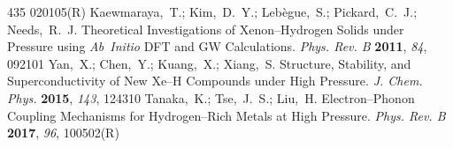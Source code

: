 \documentclass[12pt,letterpaper,oneside]{article}
\begin{document}
\begin{mcitethebibliography}{435}
  020105(R)\relax
\mciteBstWouldAddEndPuncttrue
\mciteSetBstMidEndSepPunct{\mcitedefaultmidpunct}
{\mcitedefaultendpunct}{\mcitedefaultseppunct}\relax
\EndOfBibitem
{}
Kaewmaraya,~T.; Kim,~D.~Y.; Leb{\`e}gue,~S.; Pickard,~C.~J.; Needs,~R.~J.
    Theoretical Investigations of Xenon--Hydrogen Solids under
  Pressure using \emph{Ab~Initio} DFT and GW Calculations. \emph{Phys. Rev. B}
  \textbf{2011}, \emph{84}, 092101\relax
\mciteBstWouldAddEndPuncttrue
\mciteSetBstMidEndSepPunct{\mcitedefaultmidpunct}
{\mcitedefaultendpunct}{\mcitedefaultseppunct}\relax
\EndOfBibitem
{}
Yan,~X.; Chen,~Y.; Kuang,~X.; Xiang,~S. Structure, Stability, and
  Superconductivity of New Xe--H Compounds under High Pressure. \emph{J. Chem.
  Phys.} \textbf{2015}, \emph{143}, 124310\relax
\mciteBstWouldAddEndPuncttrue
\mciteSetBstMidEndSepPunct{\mcitedefaultmidpunct}
{\mcitedefaultendpunct}{\mcitedefaultseppunct}\relax
\EndOfBibitem
{}
Tanaka,~K.; Tse,~J.~S.; Liu,~H. Electron--Phonon Coupling Mechanisms for
  Hydrogen--Rich Metals at High Pressure. \emph{Phys. Rev. B} \textbf{2017},
  \emph{96}, 100502(R)\relax
\mciteBstWouldAddEndPuncttrue
\mciteSetBstMidEndSepPunct{\mcitedefaultmidpunct}
{\mcitedefaultendpunct}{\mcitedefaultseppunct}\relax
\EndOfBibitem
\end{mcitethebibliography}
\end{document}
